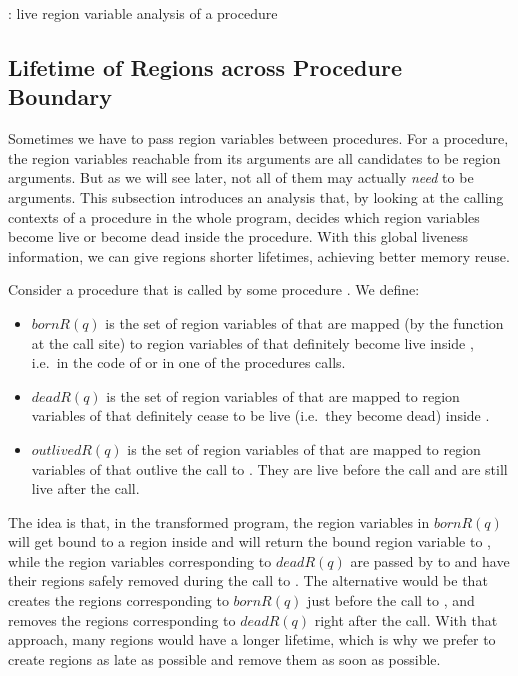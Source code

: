 \documentclass{tlp}
\newcommand{\bornR}[1]{\ensuremath{{bornR}(#1)}}
\newcommand{\deadR}[1]{\ensuremath{{deadR}(#1)}}
\newcommand{\outlivedR}[1]{\ensuremath{{outlivedR}(#1)}}
\begin{document}
\begin{algorithm}
    \small
    \caption{:
        live region variable analysis of a procedure  }
    \label{algo:lra}
\begin{algorithmic}

        \STATE 
        \FORALL{}
            \STATE 
        \ENDFOR

        \FORALL{}
            \STATE 
        \ENDFOR
    \ENDFOR
\end{algorithmic}
\normalsize
\end{algorithm}

\subsection{Lifetime of Regions across Procedure Boundary}
\label{seClivenessCglobal}

Sometimes we have to pass region variables between procedures.
For a procedure, the region variables reachable from its arguments
are all candidates to be region arguments.
But as we will see later,
not all of them may actually \emph{need} to be arguments.
This subsection introduces an analysis that,
by looking at the calling contexts of a procedure in the whole program,
decides which region variables become live or become dead inside the procedure.
With this global liveness information,
we can give regions shorter lifetimes, achieving better memory reuse.

Consider a procedure  that is called by some procedure .
We define:
\begin{itemize}
    \item \bornR{q} is the set of region variables of 
    that are mapped (by the  function at the call site) to
    region variables of  that definitely become live inside ,
    i.e.\ in the code of  or in one of the procedures  calls.
    \item \deadR{q} is the set of region variables of 
    that are mapped to region variables of 
    that definitely cease to be live (i.e.\ they become dead) inside .
    \item \outlivedR{q} is the set of region variables of 
    that are mapped to region variables of  that outlive the call to .
    They are live before the call and are still live after the call.
\end{itemize}
The idea is that, in the transformed program,
the region variables in \bornR{q}
will get bound to a region inside 
and  will return the bound region variable to , while
the region variables corresponding to \deadR{q} are passed by  to 
and have their regions safely removed during the call to .
The alternative would be that
 creates the regions corresponding to \bornR{q} just before the call to ,
and removes the regions corresponding to \deadR{q} right after the call.
With that approach, many regions would have a longer lifetime,
which is why we prefer to create regions as late as possible
and remove them as soon as possible.
\end{document}
